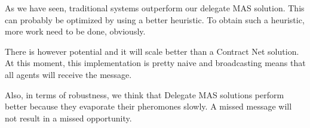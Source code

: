 \npar As we have seen, traditional systems outperform our delegate MAS solution.
This can probably be optimized by using a better heuristic. To obtain such a
heuristic, more work need to be done, obviously. 

\npar There is however potential and it will scale better than a Contract Net
solution. At this moment, this implementation is pretty naive and broadcasting
means that all agents will receive the message. 

\npar Also, in terms of robustness, we think that Delegate MAS solutions perform
better because they evaporate their pheromones slowly. A missed message will not
result in a missed opportunity.
